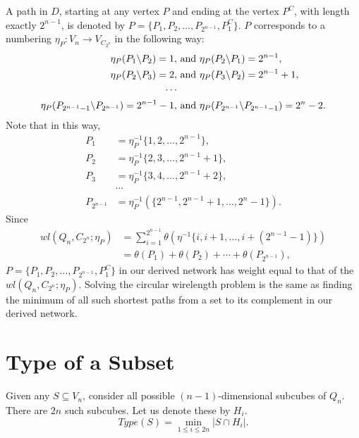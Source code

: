 \documentclass[12pt]{ucthesis}
\theoremstyle{plain}
\theoremstyle{definition}
\begin{document}
A path in $D$, starting at any vertex $P$ and ending at the vertex $P^C$,
with length exactly $2^{n - 1}$,
is denoted by $P = \{P_1, P_2, \dots, P_{2^{n - 1}}, P_1^C\}$.
$P$ corresponds to a numbering $\eta_P \colon V_n \rightarrow V_{C_{2^n}}$ in the following way:
\begin{align*}
\eta_P(P_1 \backslash P_2) = 1, & \textnormal{ and }
\eta_P(P_2 \backslash P_1) = 2^{n - 1}, \\
\eta_P(P_2 \backslash P_3) = 2, & \textnormal{ and }
\eta_P(P_3 \backslash P_2) = 2^{n - 1} + 1, \\
\cdots \\
\eta_P(P_{2^{n - 1} - 1} \backslash P_{2^{n - 1}}) = 2^{n - 1} - 1, & \textnormal{ and }
\eta_P(P_{2^{n - 1}} \backslash P_{2^{n - 1} - 1}) = 2^n - 2.
\end{align*}
Note that in this way,
\begin{align*}
P_1 & = \eta_P^{-1}\{1, 2, \dots, 2^{n - 1}\}, \\
P_2 & = \eta_P^{-1}\{2, 3, \dots, 2^{n - 1} + 1\}, \\
P_3 & = \eta_P^{-1}\{3, 4, \dots, 2^{n - 1} + 2\}, \\
& \cdots \\
P_{2^{n - 1}} & = \eta_P^{-1}(\{2^{n - 1}, 2^{n - 1} + 1, \dots, 2^n - 1\}).
\end{align*}
Since
\begin{align*}
wl(Q_n, C_{2^n}; \eta_P)
& = \sum_{i = 1}^{2^{n - 1}} \theta(\eta^{-1}\{i, i + 1, \dots, i + (2^{n - 1} - 1)\}) \\
& = \theta(P_1) + \theta(P_2) + \cdots + \theta(P_{2^{n - 1}}),
\end{align*}
$P = \{P_1, P_2, \dots, P_{2^{n - 1}}, P_1^C\}$ in our derived network has weight
equal to that of the $wl(Q_n, C_{2^n}; \eta_P)$.
Solving the circular wirelength problem is the same as finding the minimum
of all such shortest paths from a set to its complement in our derived network.

\section{Type of a Subset}
\label{Section 2.4}

Given any $S \subseteq V_n$,
consider all possible $(n - 1)$-dimensional subcubes of $Q_n$.
There are $2 n$ such subcubes.
Let us denote these by $H_i$.
\begin{equation*}
Type(S) = \min_{1 \le i \le 2 n} |S \cap H_i|.
\end{equation*}
\end{document}
